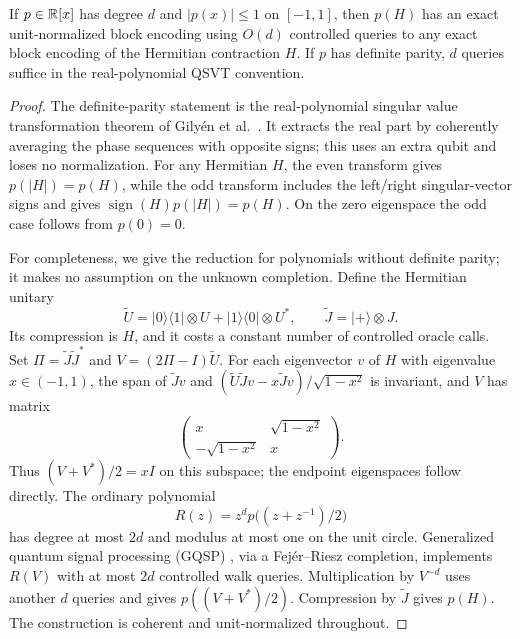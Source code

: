 \begin{lemma}\label{lem:implementation}
If $p\in\mathbb R[x]$ has degree $d$ and $|p(x)|\leq1$ on $[-1,1]$, then $p(H)$ has an exact unit-normalized block encoding using $O(d)$ controlled queries to any exact block encoding of the Hermitian contraction $H$. If $p$ has definite parity, $d$ queries suffice in the real-polynomial QSVT convention.
\end{lemma}
\begin{proof}
The definite-parity statement is the real-polynomial singular value transformation theorem of Gily\'en et al.\ \cite[Corollary 18, extended version]{gilyen2019}. It extracts the real part by coherently averaging the phase sequences with opposite signs; this uses an extra qubit and loses no normalization. For any Hermitian $H$, the even transform gives $p(|H|)=p(H)$, while the odd transform includes the left/right singular-vector signs and gives $\operatorname{sign}(H)p(|H|)=p(H)$. On the zero eigenspace the odd case follows from $p(0)=0$.

For completeness, we give the reduction for polynomials without definite parity; it makes no assumption on the unknown completion. Define the Hermitian unitary
\[
 \widetilde U=|0\rangle\langle1|\otimes U+
 |1\rangle\langle0|\otimes U^*,\qquad
 \widetilde J=|+\rangle\otimes J.
\]
Its compression is $H$, and it costs a constant number of controlled oracle calls. Set $\Pi=\widetilde J\widetilde J^*$ and $V=(2\Pi-I)\widetilde U$. For each eigenvector $v$ of $H$ with eigenvalue $x\in(-1,1)$, the span of $\widetilde Jv$ and $(\widetilde U\widetilde Jv-x\widetilde Jv)/\sqrt{1-x^2}$ is invariant, and $V$ has matrix
\[
 \begin{pmatrix}x&\sqrt{1-x^2}\\-\sqrt{1-x^2}&x\end{pmatrix}.
\]
Thus $(V+V^*)/2=xI$ on this subspace; the endpoint eigenspaces follow directly. The ordinary polynomial
\[
 R(z)=z^d p\bigl((z+z^{-1})/2\bigr)
\]
has degree at most $2d$ and modulus at most one on the unit circle. Generalized quantum signal processing (GQSP) \cite{motlagh2024}, via a Fej\'er--Riesz completion, implements $R(V)$ with at most $2d$ controlled walk queries. Multiplication by $V^{-d}$ uses another $d$ queries and gives $p((V+V^*)/2)$. Compression by $\widetilde J$ gives $p(H)$. The construction is coherent and unit-normalized throughout.
\end{proof}

